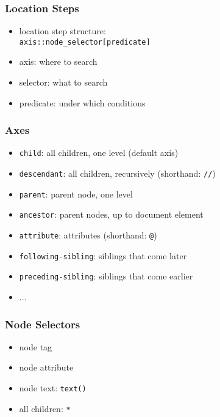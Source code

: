 \documentclass[dvipsnames]{beamer}
\theoremstyle{plain}
\begin{document}
\begin{frame}
  \frametitle{Location Steps}

  \begin{itemize}
    \item location step structure:\\
      \lstinline!axis::node_selector[predicate]!

    \medskip
    \item axis: where to search
    \item selector: what to search
    \item predicate: under which conditions
  \end{itemize}
\end{frame}

\begin{frame}
  \frametitle{Axes}

  \begin{itemize}
    \item \lstinline!child!:
      all children, one level (default axis)
    \item \lstinline!descendant!:
      all children, recursively (shorthand: \lstinline!//!)
    \item \lstinline!parent!:
      parent node, one level
    \item \lstinline!ancestor!:
      parent nodes, up to document element
    \item \lstinline!attribute!:
      attributes (shorthand: \lstinline!@!)
    \item \lstinline!following-sibling!:
      siblings that come later
    \item \lstinline!preceding-sibling!:
      siblings that come earlier
    \item ...
  \end{itemize}
\end{frame}

\begin{frame}
  \frametitle{Node Selectors}

  \begin{itemize}
    \item node tag
    \item node attribute
    \item node text: \lstinline!text()!
    \item all children: \lstinline!*!
  \end{itemize}
\end{frame}
\end{document}
